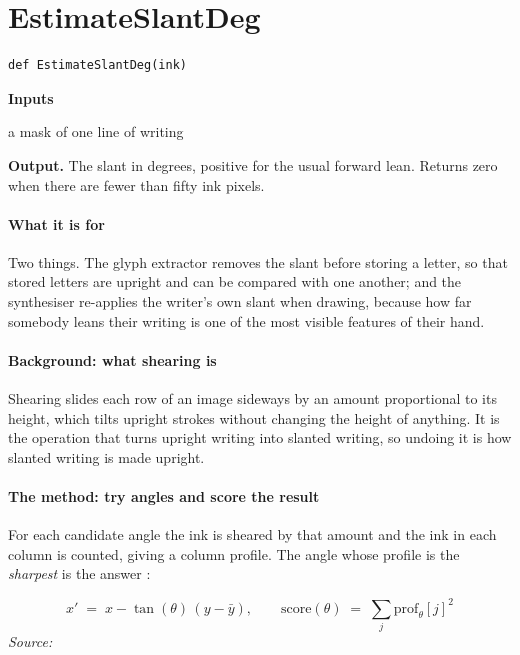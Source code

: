 \section{EstimateSlantDeg}
\begin{lstlisting}[style=sig]
def EstimateSlantDeg(ink)
\end{lstlisting}

\noindent\textbf{Inputs}
\begin{description}[leftmargin=2.2em,style=nextline,font=\normalfont\ttfamily]\setlength\itemsep{1pt}
  \item[{ink}] \normalfont a mask of one line of writing
\end{description}

\noindent\textbf{Output.} The slant in degrees, positive for the usual forward lean. Returns zero when there are fewer than fifty ink pixels.


\paragraph{What it is for}
Two things. The glyph extractor removes the slant before storing a letter, so that stored letters are upright and can be compared with one another; and the synthesiser re-applies the writer's own slant when drawing, because how far somebody leans their writing is one of the most visible features of their hand.


\paragraph{Background: what shearing is}
Shearing slides each row of an image sideways by an amount proportional to its height, which tilts upright strokes without changing the height of anything. It is the operation that turns upright writing into slanted writing, so undoing it is how slanted writing is made upright.


\paragraph{The method: try angles and score the result}
For each candidate angle the ink is sheared by that amount and the ink in each column is counted, giving a column profile. The angle whose profile is the \emph{sharpest} is the answer \cite{vinciarelli2001}:


\begin{equation}
x' \;=\; x - \tan(\theta)\,(y - \bar{y}), \qquad \mathrm{score}(\theta) \;=\; \sum_j \mathrm{prof}_\theta[j]^2
\end{equation}
\noindent\emph{Source: }\cite{vinciarelli2001}


